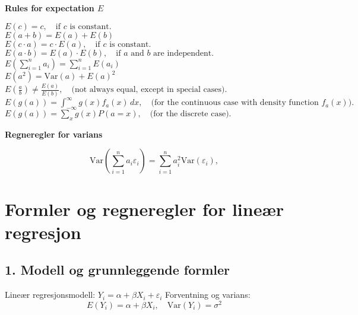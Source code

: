 \documentclass[a4paper,7pt,fleqn]{article}
\begin{document}
\begin{multicols}{2}
\begin{minipage}{\linewidth}
    
    \end{minipage}
    \begin{minipage}{\linewidth}
    
    \textbf{Rules for expectation \(E\)} 
    
    \(E(c) = c, \quad \text{if } c \text{ is constant.}\) \\
    \(E(a + b) = E(a) + E(b)\) \\
    \(E(c \cdot a) = c \cdot E(a), \quad \text{if } c \text{ is constant.}\) \\
    \(E(a \cdot b) = E(a) \cdot E(b), \quad \text{if } a \text{ and } b \text{ are independent.}\) \\
    \(E\left( \sum_{i=1}^n a_i \right) = \sum_{i=1}^n E(a_i)\) \\
    \(E(a^2) = \text{Var}(a) + E(a)^2\) \\
    \(E\left(\frac{a}{b}\right) \neq \frac{E(a)}{E(b)}, \quad \text{(not always equal, except in special cases).}\) \\
    \(E(g(a)) = \int_{-\infty}^\infty g(x) f_a(x) \, dx, \quad \text{(for the continuous case with density function } f_a(x)\text{).}\) \\
    \(E(g(a)) = \sum_{x} g(x) P(a = x), \quad \text{(for the discrete case).}\) \\
    
    
    \end{minipage}
    \begin{minipage}{\linewidth}
    \textbf{Regneregler for varians}
    
    \[
    \mathrm{Var}\left( \sum_{i=1}^{n} a_i \varepsilon_i \right) = \sum_{i=1}^{n} a_i^2 \mathrm{Var}(\varepsilon_i),
    \]
    
    
    \end{minipage}
    \begin{minipage}{\linewidth}
    
    \section*{Formler og regneregler for lineær regresjon}
    
    \subsection*{1. Modell og grunnleggende formler}
    Lineær regresjonsmodell:
    \(
    Y_i = \alpha + \beta X_i + \varepsilon_i
    \)
    Forventning og varians:
    \[
    E(Y_i) = \alpha + \beta X_i, \quad \text{Var}(Y_i) = \sigma^2
    \]
    \end{minipage}
    \begin{minipage}{\linewidth}
    

\end{minipage}
\end{multicols}
\end{document}
